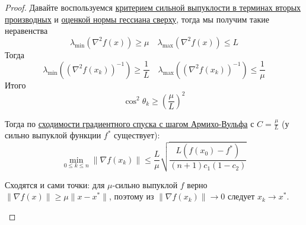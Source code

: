 \begin{proof}
  Давайте воспользуемся \hyperref[note:94DADA28-87E4-4E36-B289-8415BCE750FC]{критерием сильной выпуклости в терминах вторых производных} и
  \hyperref[note:DAA0DAE4-4B48-4A2F-9459-54790B6B129F]{оценкой нормы гессиана сверху}, тогда мы получим такие неравенства
  \[
  \lambda_{\min}(\nabla^2 f(x)) \ge \mu \quad \lambda_{\max}(\nabla^2 f(x)) \le L
  \]
  Тогда
  \[
  \lambda_{\min}\left ((\nabla^2 f(x_k))^{-1}\right) \ge \frac{1}{L}\quad
  \lambda_{\max}\left ((\nabla^2 f(x_k))^{-1} \right) \le \frac{1}{\mu}
  \]
  Итого
  \[
  \cos^2 \theta_k \ge \left( \frac{\mu}{L} \right)^2
  \]

  Тогда по \hyperref[note:36F6E1BA-41DB-460D-A9C6-B980621727D4]{сходимости градиентного спуска с шагом Армихо-Вульфа} с $C = \frac{\mu}{L}$ (у сильно выпуклой функции $f^{*}$ существует):
  \[
  \min_{0\le k\le n} \|\nabla f(x_k)\| \le \frac{L}{\mu} \sqrt{\frac{L (f(x_0) - f^{*})}{(n+1)c_1(1-c_2)}}
  \]

  \begin{remark}
    Сходятся и сами точки: для $\mu$-сильно выпуклой $f$ верно $\|\nabla f(x)\| \ge \mu \|x - x^{*}\|$, поэтому из $\|\nabla f(x_k)\| \rightarrow 0$ следует $x_k \rightarrow x^{*}$.
  \end{remark}
\end{proof}

